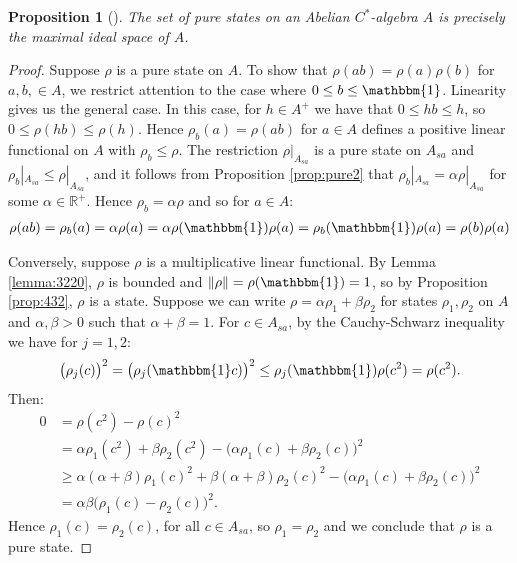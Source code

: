\documentclass[12pt,a4paper]{report}
\theoremstyle{plain}
\newtheorem{prop}{Proposition}
\theoremstyle{definition}
\newcommand{\1}{\mathbbm{1}}
\newcommand{\R}{\mathbb{R}}
\begin{document}
\begin{prop}[{\cite[4.4.1]{kadison83}}]\label{prop:puremult}
	The set of pure states on an Abelian $C^\ast$-algebra $A$ is precisely the maximal ideal space of 
	$A$.
\end{prop}
\begin{proof}
	Suppose $\rho$ is a pure state on $A$. To show that $\rho(ab)=\rho(a)\rho(b)$ for $a,b,\in A$,
	we restrict attention to the case where $0\leq b\leq\1$. Linearity gives us the general case.
	In this case, for $h\in A^+$ we have that $0\leq hb\leq h$, so $0\leq\rho(hb)\leq\rho(h)$.
	Hence $\rho_b(a)=\rho(ab)$ for $a\in A$ defines a positive linear functional on $A$ with 
	$\rho_b\leq\rho$. The restriction $\rho|_{A_{sa}}$ is a pure state on $A_{sa}$ and 
	$\rho_b|_{A_{sa}} \leq \rho|_{A_{sa}}$, and it follows from Proposition \ref{prop:pure2} that 
	$\rho_b|_{A_{sa}} = \alpha \rho|_{A_{sa}}$ for some $\alpha \in \R^+$.
	Hence $\rho_b = \alpha\rho$  and so for $a\in A$:
	\begin{align*}
		\rho(ab) = \rho_b(a) = \alpha\rho(a) = 
							\alpha\rho(\1)\rho(a) = \rho_b(\1)\rho(a) = \rho(b)\rho(a)
	\end{align*}
	
	Conversely, suppose $\rho$ is a multiplicative linear functional. By Lemma \ref{lemma:3220}, $
	\rho$ is bounded and $\|\rho\|=\rho(\1)=1$, so by Proposition \ref{prop:432}, $\rho$ is a state.
	Suppose we can write $\rho=\alpha\rho_1+\beta\rho_2$ for states $\rho_1,\rho_2$ on $A$ and 
	$\alpha,\beta >0$ such that $\alpha+\beta=1$. For $c\in A_{sa}$, by the Cauchy-Schwarz inequality
	 we have for $j=1,2$:
	\begin{align*}
		\big(\rho_j(c)\big)^2 = \big(\rho_j(\1 c)\big)^2 \leq \rho_j(\1)\rho(c^2)=\rho(c^2).
	\end{align*}
	Then:
	\begin{align*}
				0
		&=		\rho(c^2)-\rho(c)^2 											\\
		&=		\alpha\rho_1(c^2)+\beta\rho_2(c^2) 
						- \big(\alpha\rho_1(c)+\beta\rho_2(c)\big)^2			\\
		&\geq	\alpha(\alpha+\beta)\rho_1(c)^2 
						+ \beta(\alpha+\beta)\rho_2(c)^2
						- \big(\alpha\rho_1(c)+\beta\rho_2(c)\big)^2			\\
		&=		\alpha\beta\big(\rho_1(c) - \rho_2(c)\big)^2.
	\end{align*}
	Hence $\rho_1(c)=\rho_2(c)$, for all $c\in A_{sa}$, so $\rho_1=\rho_2$ and we conclude
	that $\rho$ is a pure state. 
\end{proof}
\end{document}
